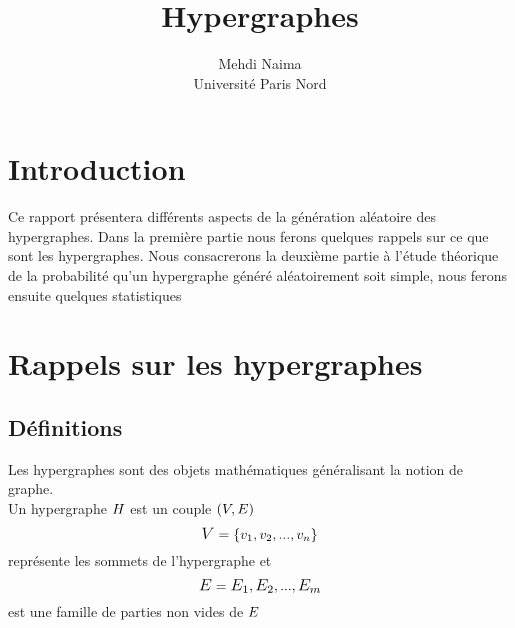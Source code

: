 \documentclass[a4paper,11pt]{article}
\author{Mehdi Naima\\ Université Paris Nord}
\title{Hypergraphes}
\begin{document}
\maketitle

\begin{abstract}

\end{abstract}










\newpage

\tableofcontents



\pagestyle{fancy}
\renewcommand\headrulewidth{0.5pt}
\fancyhead[R]{}



\newpage
\section*{Introduction}
Ce rapport présentera différents aspects de la génération aléatoire des hypergraphes. Dans la première partie nous ferons quelques rappels sur ce que sont les hypergraphes. Nous consacrerons la deuxième partie à l'étude théorique de la probabilité qu'un hypergraphe généré aléatoirement soit simple, nous ferons ensuite quelques statistiques 
\newpage

 


\section{Rappels sur les hypergraphes}


\subsection{Définitions}

Les hypergraphes sont des objets mathématiques généralisant la notion de graphe. \\
Un hypergraphe $\mathlarger{H}$ est un couple $\mathlarger{(V,E)}$\\
 \[\mathlarger{V} = \{v_{1},v_{2},...,v_{n}\} \] représente les sommets de l'hypergraphe et \[\mathlarger{E} = \mathlarger{E_{1}},  \mathlarger{E_{2}},...,\mathlarger{E_{m}} \]  est une famille de parties non vides de $\mathlarger{E}$
\end{document}
